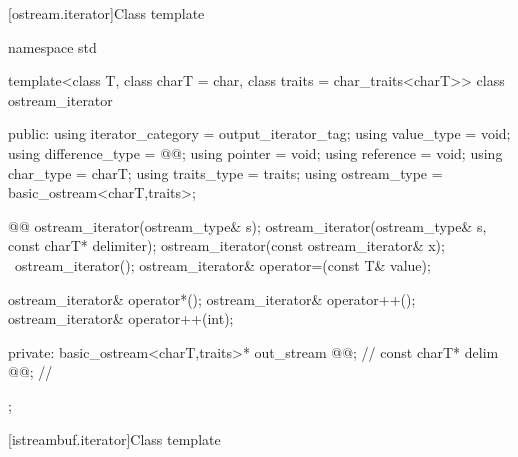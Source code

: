 \begin{itemdescr}
\pnum
\returns
{}
\end{itemdescr}

[ostream.iterator]{Class template }


\begin{codeblock}
namespace std {
  template<class T, class charT = char, class traits = char_traits<charT>>
  class ostream_iterator {
  public:
    using iterator_category = output_iterator_tag;
    using value_type        = void;
    using difference_type   = @@;
    using pointer           = void;
    using reference         = void;
    using char_type         = charT;
    using traits_type       = traits;
    using ostream_type      = basic_ostream<charT,traits>;

    @@
    ostream_iterator(ostream_type& s);
    ostream_iterator(ostream_type& s, const charT* delimiter);
    ostream_iterator(const ostream_iterator& x);
    ~ostream_iterator();
    ostream_iterator& operator=(const T& value);

    ostream_iterator& operator*();
    ostream_iterator& operator++();
    ostream_iterator& operator++(int);

  private:
    basic_ostream<charT,traits>* out_stream @@;  // \expos
    const charT* delim @@;                       // \expos
  };
}
\end{codeblock}

[istreambuf.iterator]{Class template }


